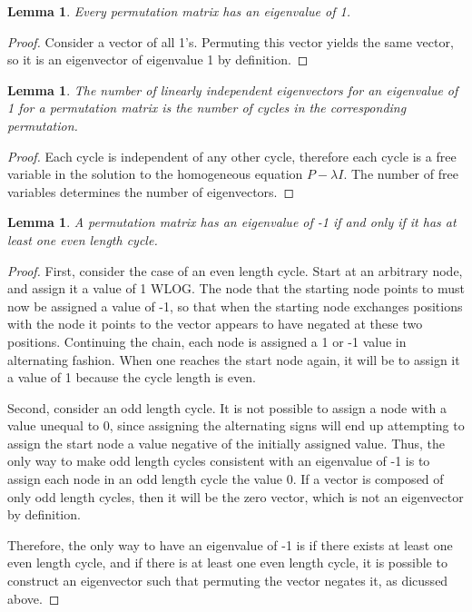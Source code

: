 \documentclass[11pt, oneside]{article}
\theoremstyle{plain}
\newtheorem{lemma}[theorem]{Lemma}
\theoremstyle{definition}
\begin{document}
\begin{lemma}
Every permutation matrix has an eigenvalue of 1.
\end{lemma}

\begin{proof}
Consider a vector of all 1's. Permuting this vector yields the same vector,
so it is an eigenvector of eigenvalue 1 by definition.
\end{proof}

\begin{lemma}
The number of linearly independent eigenvectors for an eigenvalue of 1 for a permutation matrix
is the number of cycles in the corresponding permutation.
\end{lemma}

\begin{proof}
Each cycle is independent of any other cycle, therefore each cycle
is a free variable in the solution to the homogeneous equation \( P - \lambda I \).
The number of free variables determines the number of eigenvectors.
\end{proof}

\begin{lemma}
A permutation matrix has an eigenvalue of -1 if and only if it has at least one even length cycle.
\end{lemma}
\begin{proof}
First, consider the case of an even length cycle. Start at an arbitrary node,
and assign it a value of 1 WLOG. The node that the starting node points to must
now be assigned a value of -1, so that when the starting node exchanges positions
with the node it points to the vector appears to have negated at these two positions.
Continuing the chain, each node is assigned a 1 or -1 value in alternating fashion.
When one reaches the start node again, it will be to assign it a value of 1
because the cycle length is even.

Second, consider an odd length cycle. It is not possible to assign a node
with a value unequal to 0, since assigning the alternating signs will end up
attempting to assign the start node a value negative
of the initially assigned value. Thus, the only way to make odd length cycles
consistent with an eigenvalue of -1 is to assign each node in an odd length
cycle the value 0. If a vector is composed of only odd length cycles, then it will be
the zero vector, which is not an eigenvector by definition.

Therefore, the only way to have an eigenvalue of -1 is if there exists at least
one even length cycle, and if there is at least one even length cycle,
it is possible to construct an eigenvector such that permuting the vector
negates it, as dicussed above.
\end{proof}
\end{document}
